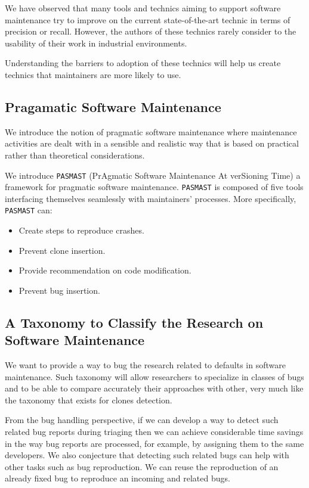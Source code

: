 We have observed that many tools and technics aiming to support software maintenance try to improve on the current state-of-the-art technic in terms of precision or recall.
However, the authors of these technics rarely consider to the usability of their work in industrial environments\cite{Jin2012,Chen2013,Hovemeyer2007}.

Understanding the barriers to adoption of these technics will help us create technics that maintainers are more likely to use.

\subsection{Pragamatic Software Maintenance}

We introduce the notion of pragmatic software maintenance where maintenance activities are dealt with in a sensible and realistic way that is based on practical rather than theoretical considerations.

We introduce {\tt PASMAST} (PrAgmatic Software Maintenance At verSioning Time) a framework for pragmatic software maintenance.
{\tt PASMAST} is composed of five tools interfacing themselves seamlessly with maintainers' processes.
More specifically, {\tt PASMAST} can:
\begin{itemize}
	\item Create steps to reproduce crashes.
	\item Prevent clone insertion.
	\item Provide recommendation on code modification.
	\item Prevent bug insertion.
\end{itemize}

\subsection{A Taxonomy to Classify the Research on Software Maintenance}

We want to provide a way to bug the research related to defaults in software maintenance.
Such taxonomy will allow researchers to specialize in classes of bugs and to be able to compare accurately their approaches with other, very much like the taxonomy that exists for clones detection\cite{CoryKapser}.

From the bug handling perspective, if we can develop a
way to detect such related bug reports during triaging then we can achieve considerable time savings in the way bug reports are processed, for example, by assigning them to the same developers.
We also conjecture that detecting such related bugs can help with other tasks such as bug reproduction.
We can reuse the reproduction of an already fixed bug to reproduce an incoming and related bugs.

